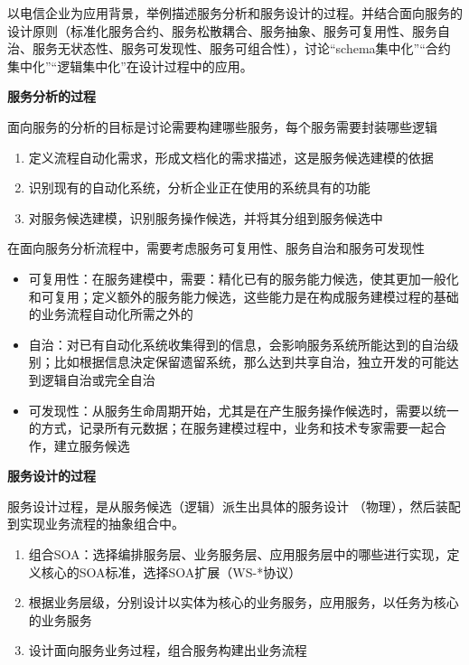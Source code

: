 \begin{problem}
以电信企业为应用背景，举例描述服务分析和服务设计的过程。并结合面向服务的设计原则（标准化服务合约、服务松散耦合、服务抽象、服务可复用性、服务自治、服务无状态性、服务可发现性、服务可组合性），讨论“schema集中化”“合约集中化”“逻辑集中化”在设计过程中的应用。
\end{problem}

\begin{solution}
\textbf{服务分析的过程} \par
面向服务的分析的目标是讨论需要构建哪些服务，每个服务需要封装哪些逻辑
\begin{enumerate}[label=\arabic*.]
    \item 定义流程自动化需求，形成文档化的需求描述，这是服务候选建模的依据
    \item 识别现有的自动化系统，分析企业正在使用的系统具有的功能
    \item 对服务候选建模，识别服务操作候选，并将其分组到服务候选中
\end{enumerate}

在面向服务分析流程中，需要考虑服务可复用性、服务自治和服务可发现性
\begin{itemize}
    \item 可复用性：在服务建模中，需要：精化已有的服务能力候选，使其更加一般化和可复用；定义额外的服务能力候选，这些能力是在构成服务建模过程的基础的业务流程自动化所需之外的
    \item 自治：对已有自动化系统收集得到的信息，会影响服务系统所能达到的自治级别；比如根据信息決定保留遗留系统，那么达到共享自治，独立开发的可能达到逻辑自治或完全自治
    \item 可发现性：从服务生命周期开始，尤其是在产生服务操作候选时，需要以统一的方式，记录所有元数据；在服务建模过程中，业务和技术专家需要一起合作，建立服务候选
\end{itemize}

\textbf{服务设计的过程} \par
服务设计过程，是从服务候选（逻辑）派生出具体的服务设计 （物理），然后装配到实现业务流程的抽象组合中。
\begin{enumerate}[label=\arabic*.]
    \item 组合SOA：选择编排服务层、业务服务层、应用服务层中的哪些进行实现，定义核心的SOA标准，选择SOA扩展（WS-*协议）
    \item 根据业务层级，分别设计以实体为核心的业务服务，应用服务，以任务为核心的业务服务
    \item 设计面向服务业务过程，组合服务构建出业务流程
\end{enumerate}


\end{solution}
